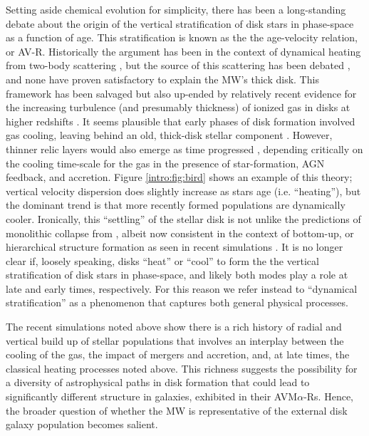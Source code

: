 Setting aside chemical evolution for simplicity, there has been a
long-standing debate about the origin of the vertical stratification
of disk stars in phase-space as a function of age. This stratification
is known as the the age-velocity relation, or AV-R. Historically the
argument has been in the context of dynamical heating from two-body
scattering \citep{Spitzer51}, but the source of this scattering has
been debated \citep[e.g., giant molecular clouds, transient spiral
structure, or dwarf satellite
galaxies][]{Spitzer51,Spitzer53,Wielen77,Quinn93,Binney00}, and none
have proven satisfactory to explain the MW's thick disk.  This
framework has been salvaged but also up-ended by relatively recent
evidence for the increasing turbulence (and presumably thickness) of
ionized gas in disks at higher redshifts
\citep{Weiner06,Forster-Schreiber09,Wisnioski15}. It seems plausible
that early phases of disk formation involved gas cooling, leaving
behind an old, thick-disk stellar component
\citep{Brook04,Bournaud09}. However, thinner relic layers would also
emerge as time progressed \citep{Bird13}, depending critically on the
cooling time-scale for the gas in the presence of star-formation, AGN
feedback, and accretion. Figure \ref{intro:fig:bird} shows an example
of this theory; vertical velocity dispersion does slightly increase as
stars age (i.e. ``heating''), but the dominant trend is that more
recently formed populations are dynamically cooler. Ironically, this
``settling'' of the stellar disk is not unlike the predictions of
monolithic collapse from \citet{ELS}, albeit now consistent in the
context of bottom-up, or hierarchical structure formation as seen in
recent simulations \citep[e.g.,][]{Bird13,Martig14a}.  It is no longer
clear if, loosely speaking, disks ``heat'' or ``cool'' to form the the
vertical stratification of disk stars in phase-space, and likely both
modes play a role at late and early times, respectively. For this
reason we refer instead to ``dynamical stratification'' as a
phenomenon that captures both general physical processes.

The recent simulations noted above show there is a rich history of
radial and vertical build up of stellar populations that involves an
interplay between the cooling of the gas, the impact of mergers and
accretion, and, at late times, the classical heating processes noted
above.  This richness suggests the possibility for a diversity of
astrophysical paths in disk formation that could lead to significantly
different structure in galaxies, exhibited in their
AVM$\alpha$-Rs. Hence, the broader question of whether the MW is
representative of the external disk galaxy population becomes salient.

